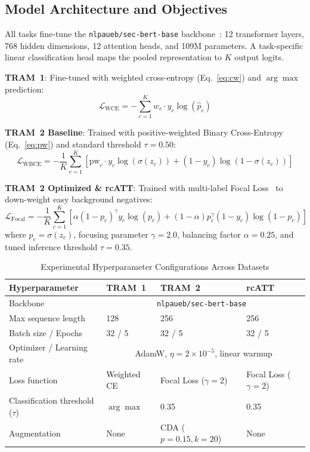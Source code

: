 \documentclass[runningheads]{llncs}
\begin{document}
\subsection{Model Architecture and Objectives}
All tasks fine-tune the \texttt{nlpaueb/sec-bert-base} backbone~\cite{secbert2022}: 12 transformer layers, 768 hidden dimensions, 12 attention heads, and 109M parameters. A task-specific linear classification head maps the pooled representation to $K$ output logits.

\textbf{TRAM~1}: Fine-tuned with weighted cross-entropy (Eq.~\ref{eq:cw}) and $\arg\max$ prediction:
\begin{equation}
  \mathcal{L}_{\mathrm{WCE}} = -\sum_{c=1}^K w_c \cdot y_c \log(\hat{p}_c)
\end{equation}

\textbf{TRAM~2 Baseline}: Trained with positive-weighted Binary Cross-Entropy (Eq.~\ref{eq:pw}) and standard threshold $\tau=0.50$:
\begin{equation}
  \mathcal{L}_{\mathrm{WBCE}} = -\frac{1}{K}\sum_{c=1}^K \left[ \mathrm{pw}_c \cdot y_c \log(\sigma(z_c)) + (1-y_c)\log(1-\sigma(z_c)) \right]
\end{equation}

\textbf{TRAM~2 Optimized \& rcATT}: Trained with multi-label Focal Loss~\cite{lin2017focal} to down-weight easy background negatives:
\begin{equation}
  \mathcal{L}_{\mathrm{Focal}} = -\frac{1}{K}\sum_{c=1}^K \left[ \alpha (1-p_c)^\gamma y_c \log(p_c) + (1-\alpha) p_c^\gamma (1-y_c)\log(1-p_c) \right]
\end{equation}
where $p_c = \sigma(z_c)$, focusing parameter $\gamma = 2.0$, balancing factor $\alpha = 0.25$, and tuned inference threshold $\tau = 0.35$.

\begin{table}[t]
\caption{Experimental Hyperparameter Configurations Across Datasets}
\label{tab:hp}
\centering
\begin{tabular}{llll}
\toprule
Hyperparameter & TRAM~1 & TRAM~2 & rcATT \\
\midrule
Backbone & \multicolumn{3}{c}{\texttt{nlpaueb/sec-bert-base}~\cite{secbert2022}} \\
Max sequence length & 128 & 256 & 256 \\
Batch size / Epochs & 32 / 5 & 32 / 5 & 32 / 5 \\
Optimizer / Learning rate & \multicolumn{3}{c}{AdamW, $\eta = 2\times 10^{-5}$, linear warmup} \\
Loss function & Weighted CE & Focal Loss ($\gamma{=}2$) & Focal Loss ($\gamma{=}2$) \\
Classification threshold ($\tau$) & $\arg\max$ & 0.35 & 0.35 \\
Augmentation & None & CDA ($p{=}0.15, k{=}20$) & None \\
\bottomrule
\end{tabular}
\end{table}
\end{document}
